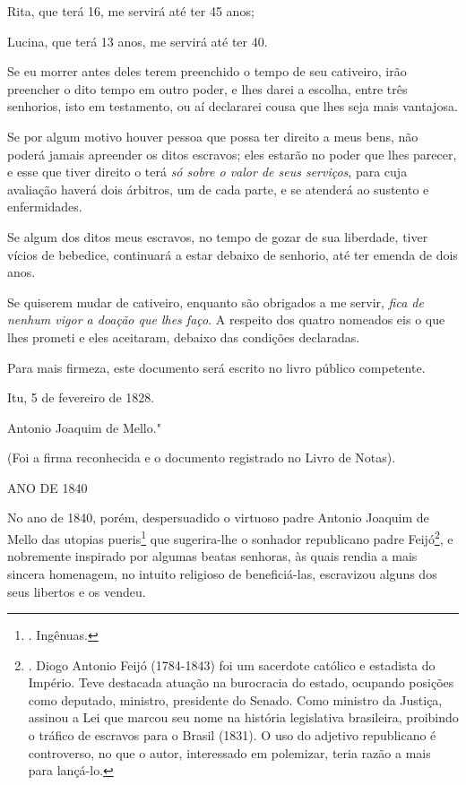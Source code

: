 Rita, que terá 16, me servirá até ter 45 anos;

Lucina, que terá 13 anos, me servirá até ter 40.

Se eu morrer antes deles terem preenchido o tempo de seu cativeiro, irão
preencher o dito tempo em outro poder, e lhes darei a escolha, entre
três senhorios, isto em testamento, ou aí declararei cousa que lhes seja
mais vantajosa.

Se por algum motivo houver pessoa que possa ter direito a meus bens, não
poderá jamais apreender os ditos escravos; eles estarão no poder que
lhes parecer, e esse que tiver direito o terá \emph{só sobre o valor de
seus serviços}, para cuja avaliação haverá dois árbitros, um de cada
parte, e se atenderá ao sustento e enfermidades.

Se algum dos ditos meus escravos, no tempo de gozar de sua liberdade,
tiver vícios de bebedice, continuará a estar debaixo de senhorio, até
ter emenda de dois anos.

Se quiserem mudar de cativeiro, enquanto são obrigados a me servir,
\emph{fica de nenhum vigor a doação que lhes faço}. A respeito dos
quatro nomeados eis o que lhes prometi e eles aceitaram, debaixo das
condições declaradas.

Para mais firmeza, este documento será escrito no livro público
competente.

Itu, 5 de fevereiro de 1828.

Antonio Joaquim de Mello."

(Foi a firma reconhecida e o documento registrado no Livro de Notas).

ANO DE 1840

No ano de 1840, porém, despersuadido o virtuoso padre Antonio Joaquim de
Mello das utopias pueris\footnote{. Ingênuas.} que sugerira-lhe o
sonhador republicano padre Feijó\footnote{. Diogo Antonio Feijó
  (1784-1843) foi um sacerdote católico e estadista do Império. Teve
  destacada atuação na burocracia do estado, ocupando posições como
  deputado, ministro, presidente do Senado. Como ministro da Justiça,
  assinou a Lei que marcou seu nome na história legislativa brasileira,
  proibindo o tráfico de escravos para o Brasil (1831). O uso do
  adjetivo republicano é controverso, no que o autor, interessado em
  polemizar, teria razão a mais para lançá-lo.}, e nobremente inspirado
por algumas beatas senhoras, às quais rendia a mais sincera homenagem,
no intuito religioso de beneficiá-las, escravizou alguns dos seus
libertos e os vendeu.

